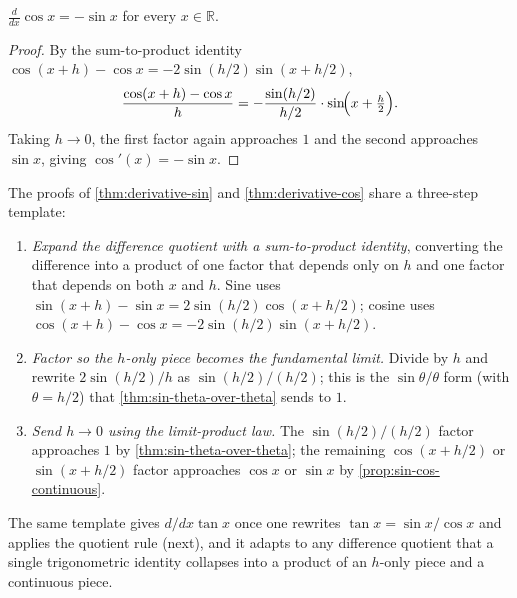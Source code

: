 \begin{theorem}\label{thm:derivative-cos}
\(\displaystyle \frac{d}{dx} \cos x = -\sin x\) for every \(x \in \mathbb{R}\).
\end{theorem}

\begin{proof}
By the sum-to-product identity \(\cos(x + h) - \cos x = -2 \sin(h/2) \sin(x + h/2)\),
\[
\frac{\cos(x + h) - \cos x}{h}
= -\frac{\sin(h/2)}{h/2} \cdot \sin\!\Bigl(x + \tfrac{h}{2}\Bigr).
\]
Taking \(h \to 0\), the first factor again approaches \(1\) and the second approaches \(\sin x\), giving \(\cos'(x) = -\sin x\).
\end{proof}

\begin{strategy}
The proofs of \cref{thm:derivative-sin} and \cref{thm:derivative-cos} share a three-step template:
\begin{enumerate}
    \item \emph{Expand the difference quotient with a sum-to-product identity}, converting the difference into a product of one factor that depends only on \(h\) and one factor that depends on both \(x\) and \(h\). Sine uses \(\sin(x + h) - \sin x = 2 \sin(h/2) \cos(x + h/2)\); cosine uses \(\cos(x + h) - \cos x = -2 \sin(h/2) \sin(x + h/2)\).
    \item \emph{Factor so the \(h\)-only piece becomes the fundamental limit.} Divide by \(h\) and rewrite \(2 \sin(h/2)/h\) as \(\sin(h/2)/(h/2)\); this is the \(\sin \theta / \theta\) form (with \(\theta = h/2\)) that \cref{thm:sin-theta-over-theta} sends to \(1\).
    \item \emph{Send \(h \to 0\) using the limit-product law.} The \(\sin(h/2)/(h/2)\) factor approaches \(1\) by \cref{thm:sin-theta-over-theta}; the remaining \(\cos(x + h/2)\) or \(\sin(x + h/2)\) factor approaches \(\cos x\) or \(\sin x\) by \cref{prop:sin-cos-continuous}.
\end{enumerate}
The same template gives \(d/dx \tan x\) once one rewrites \(\tan x = \sin x / \cos x\) and applies the quotient rule (next), and it adapts to any difference quotient that a single trigonometric identity collapses into a product of an \(h\)-only piece and a continuous piece.
\end{strategy}


